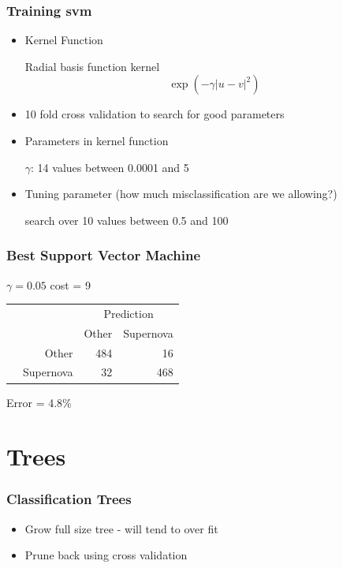 \documentclass{beamer}
\begin{document}
\begin{frame}
	\frametitle{Training svm}
	\begin{itemize}
				\item Kernel Function
				
				Radial basis function kernel
				\[
				\exp(-\gamma |u-v|^2)
				\]
				\item 10 fold cross validation to search for good parameters
				\item Parameters in kernel function

				$\gamma$:  14 values between 0.0001 and 5
				
				\item Tuning parameter (how much misclassification are we allowing?)
				
				search over 10 values between 0.5 and 100
	\end{itemize}
\end{frame}


\begin{frame}
	
	\frametitle{Best Support Vector Machine}
	$\gamma = 0.05 $ cost = 9
	\begin{table}
	\begin{tabular}{cr|rr}
	& & \multicolumn{2}{c}{Prediction}\\
	& & Other & Supernova\\
	\hline
	\multirow{2}{*}{\rotatebox{90}{Actual}} & Other &  484 &  16\\
	& Supernova & 32 &  468\\
	\end{tabular}
	\end{table}
	Error = 4.8\%

\end{frame}

\section{Trees}
	\begin{frame}
		\frametitle{Classification Trees}
		\begin{itemize}
			\item Grow full size tree - will tend to over fit
			\item Prune back using cross validation
		\end{itemize}
	\end{frame}
\end{document}
